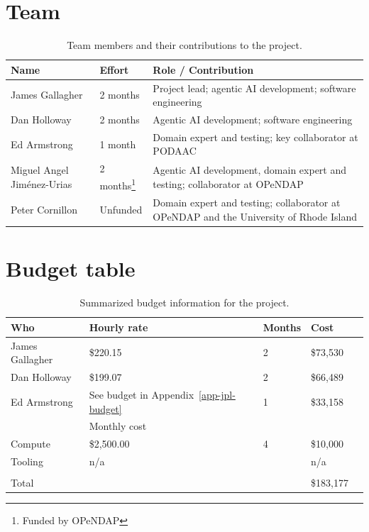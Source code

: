 \documentclass[11pt]{article}
\begin{document}
\section{Team}
\label{app-team}
\begin{table}[htbp]
  \centering
  \caption{Team members and their contributions to the project.}
  \label{tab-team}
\begin{minipage}
{\linewidth}
\begin{tabular}{|l|l|p{3.5in}|}
\hline
Name & Effort & Role / Contribution \\
\hline
James Gallagher & 2 months & Project lead; agentic \ac{AI} development; software engineering \\
\hline
Dan Holloway & 2 months & Agentic \ac{AI} development; software engineering \\
\hline
Ed Armstrong & 1 month & Domain expert and testing; key collaborator at \ac{PODAAC} \\
\hline
Miguel Angel Jim\'{e}nez-Urias & 2 months\footnote{Funded by \ac{OPeNDAP}} & Agentic \ac{AI} development, domain expert and testing; collaborator at \acs{OPeNDAP} \\
\hline
Peter Cornillon & Unfunded & Domain expert and testing; collaborator at
\ac{OPeNDAP} and the University of Rhode Island \\
\hline
\end{tabular}
\end{minipage}
\end{table}


\section{Budget table}
\label{app-budget}
\begin{table}[htbp]
  \centering
  \caption{Summarized budget information for the project.}
  \label{tab-budget}
\begin{tabular}{|l|l|l|l|l|}

\hline
Who & Hourly rate & Months & Cost \\
\hline
James Gallagher & \$220.15 & 2 & \$73,530 \\
\hline
Dan Holloway & \$199.07 & 2 & \$66,489 \\
\hline
Ed Armstrong & See budget in Appendix~\ref{app-jpl-budget} & 1 & \$33,158 \\
\hline
 & Monthly cost & &  \\
\hline
Compute & \$2,500.00 & 4 & \$10,000 \\
\hline
Tooling & n/a & & n/a \\
\hline
 &  &  &  \\
\hline
Total &  &  & \$183,177 \\
\hline
\end{tabular}
\end{table}
\end{document}
